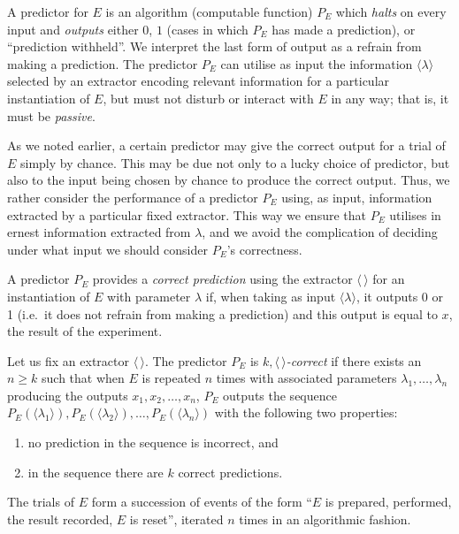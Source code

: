 \documentclass[%
 superscriptaddress,
 preprint,
 showpacs,
 showkeys,
 preprintnumbers,
  amsmath,amssymb,
  aps,
 pra,
  longbibliography,
  floatfix,
 ]{revtex4-1}
\theoremstyle{definition}
\begin{document}
A predictor for $E$ is an algorithm  (computable function) $P_E$ which \emph{halts} on every input and \emph{outputs} either $0$, $1$ (cases in which  $P_E$ has made a prediction), or ``prediction withheld''.
We interpret the last form of output as a refrain from making a prediction.
The predictor $P_E$ can utilise as input the information $\langle\lambda\rangle$ selected by an extractor
encoding  relevant information for a particular instantiation of $E$, but must not disturb or interact with $E$ in any way;
that is, it must be \emph{passive}.

As we noted earlier, a certain predictor may give the correct output for a trial of $E$ simply by chance.
This may be due not only to a lucky choice of predictor, but also to the input being chosen by chance to produce the correct output.
Thus, we rather  consider the performance of a predictor $P_E$  using, as input, information extracted by a particular fixed extractor.
This way we ensure that $P_E$ utilises in ernest information extracted from $\lambda$,
and we avoid the complication of deciding under what input we should consider $P_E$'s correctness.

A predictor $P_E$ provides a \emph{correct prediction} using the extractor $\langle \, \rangle$ for an instantiation of $E$ with parameter $\lambda$ if, when taking as input $\langle \lambda \rangle$, it outputs 0 or 1 (i.e.\ it does not refrain from making a prediction) and this output is equal to $x$, the result of the experiment.

Let us fix an extractor $\langle \, \rangle$. The predictor $P_E$ is {\em $k,\langle \, \rangle$-correct} if there exists an $n\ge k$ such that when $E$ is repeated $n$ times with associated parameters $\lambda_1 ,\dots, \lambda_n$ producing the outputs $x_1,x_2,\dots ,x_n$, $P_E$ outputs the sequence $P_E(\langle\lambda_1\rangle), P_E(\langle\lambda_2\rangle),\dots ,P_E(\langle\lambda_n\rangle)$ with the following two properties:
\begin{enumerate}
\item no prediction in the sequence is incorrect, and
\item in the sequence there are $k$ correct predictions.
\end{enumerate}
The trials of $E$ form a succession of events of the form ``$E$ is prepared, performed, the result recorded, $E$ is reset'', iterated $n$ times in an algorithmic fashion.
\end{document}
